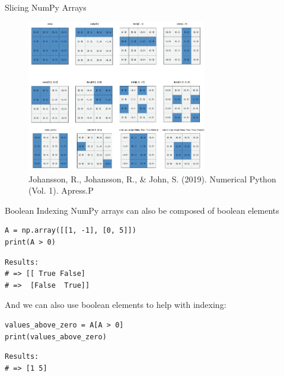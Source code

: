 \documentclass[10pt]{beamer}
\begin{document}
\begin{frame}[label={sec:org3128ffe}]{Slicing NumPy Arrays}
\begin{figure}[htbp]
\centering
\includegraphics[width=0.7\textwidth]{./images/indexing.png}
\caption{Johansson, R., Johansson, R., \& John, S. (2019). Numerical Python (Vol. 1). Apress.P}
\end{figure}
\end{frame}

\begin{frame}[label={sec:orge9d0f98},fragile]{Boolean Indexing}
 NumPy arrays can also be composed of boolean elements

\begin{verbatim}
A = np.array([[1, -1], [0, 5]])
print(A > 0)
\end{verbatim}

\begin{verbatim}
Results: 
# => [[ True False]
# =>  [False  True]]
\end{verbatim}


And we can also use boolean elements to help with indexing:

\begin{verbatim}
values_above_zero = A[A > 0]
print(values_above_zero)
\end{verbatim}

\begin{verbatim}
Results: 
# => [1 5]
\end{verbatim}
\end{frame}
\end{document}
